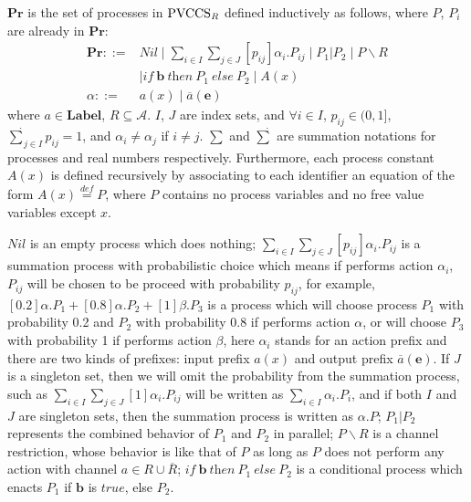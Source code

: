 \documentclass{acm_proc_article-sp}
\begin{document}
$\mathbf{Pr}$ is the set of processes in $\rm{PVCCS_{\textit{R}}}$ defined inductively as follows, where $P$, $P_{i}$ are already in $\mathbf{Pr}$:\\
\begin{equation*}
\begin{aligned}
\mathbf{Pr}::=&Nil\mid \underset{i\in I}{\sum}\underset{j\in J}{\sum}[p_{\textit{ij}}]\alpha_{\textit{i}}.P_{\textit{ij}}\mid P_1|P_2\mid P\backslash R\\&
\mid \textit{if}~\mathbf{b}~\textit{then}~P_1~\textit{else}~P_2
\mid A(x)\\
\alpha::=&a(x)\mid \overline{a}(\mathbf{e})
\end{aligned}
\end{equation*}
where $a\in \mathbf{Label}$, $R\subseteq \mathcal{A}$. $I$, $J$ are index sets, and $\forall i\in I$, $p_{\textit{ij}}\in (0,1]$, $\underset{j\in I}{\dot{\sum}}p_{\textit{ij}}=1$, and $\alpha_{\textit{i}}\neq \alpha_{\textit{j}}$ if $i\neq j$. $\sum$ and $\dot{\sum}$ are summation notations for processes and real numbers respectively. Furthermore, each process constant $A(x)$ is defined recursively by associating to each identifier an equation of the form $A(x)\stackrel{\textit{def}}{=}P$, where $P$ contains no process variables and no free value variables except $x$.

$Nil$ is an empty process which does nothing; $\underset{i\in I}{\sum}\underset{j\in J}{\sum}[p_{\textit{ij}}]\alpha_{\textit{i}}.P_{\textit{ij}}$ is a summation process with probabilistic choice which means if performs action $\alpha_{\textit{i}}$, $P_{\textit{ij}}$ will be chosen to be proceed with probability $p_{\textit{ij}}$, for example, $[0.2]\alpha.P_{1}+ [0.8]\alpha.P_{2}+[1]\beta.P_{3}$ is a process which will choose process $P_{1}$ with probability 0.2 and $P_{2}$ with probability 0.8 if performs action $\alpha$, or will choose $P_{3}$ with probability 1 if performs action $\beta$, here $\alpha_{i}$ stands for an action prefix and there are two kinds of prefixes: input prefix $a(x)$ and output prefix $\overline{a}(\mathbf{e})$. If $J$ is a singleton set, then we will omit the probability from the summation process, such as $\underset{i\in I}{\sum}\underset{j\in J}{\sum}[1]\alpha_{\textit{i}}.P_{\textit{ij}}$ will be written as $\underset{i\in I}{\sum}\alpha_{\textit{i}}.P_{\textit{i}}$, and if both $I$ and $J$ are singleton sets, then the summation process is written as $\alpha.P$; $P_{1}|P_{2}$ represents the combined behavior of $P_{1}$ and $P_{2}$ in parallel; $P\backslash R$ is a channel restriction, whose behavior is like that of $P$ as long as $P$ does not perform any action with channel $a\in R\cup \overline{R}$;
$\textit{if}~\mathbf{b}~\textit{then}~P_1~\textit{else}~P_2$ is a conditional process which enacts $P_{1}$ if $\mathbf{b}$ is $true$, else $P_{2}$.
\end{document}
